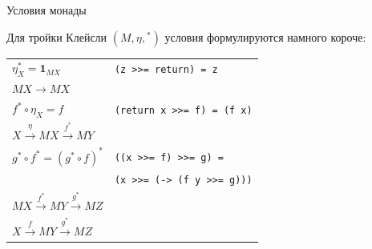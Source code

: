 \documentclass[xcolor=dvipsnames]{beamer}
\newcommand{\One}{\mathbf{1}}
\begin{document}
\begin{frame}{Условия монады}
 
  Для тройки Клейсли $(M, \eta, {}^*)$ условия формулируются намного короче:
  \begin{center}
   \begin{tabular}{ll}
    $\eta_X^* = \One_{M X}$ & 
    \texttt{(z >>= return) = z} \\
    \multicolumn{2}{l}{\hspace*{1em} $MX \to MX$} \\[10pt]
    $f^* \circ \eta_X = f$ &
    \texttt{(return x >>= f) = (f x)} \\
    \multicolumn{2}{l}{\hspace*{1em} $X \stackrel{\eta}{\to} MX \stackrel{f^*}{\to} MY$} \\[10pt]
    $g^* \circ f^* = (g^* \circ f)^*$ &
    \texttt{((x >>= f) >>= g) =}
    \\&\hspace*{10pt}
    \texttt{(x >>= (\y -> (f y >>= g)))} \\
    \multicolumn{2}{l}{\hspace*{1em} 
    $MX \stackrel{f^*}{\to} MY \stackrel{g^*}{\to} MZ$} \\
    \multicolumn{2}{l}{\hspace*{1em} 
    $X \stackrel{f}{\to} MY \stackrel{g^*}{\to} MZ$} \\
   \end{tabular}
  \end{center}
\end{frame}
\end{document}
